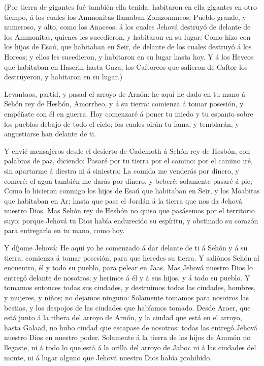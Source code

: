  (Por tierra de gigantes fué también ella tenida: habitaron
en ella gigantes en otro tiempo, á los cuales los Ammonitas llamaban
Zomzommeos;  Pueblo grande, y numeroso, y alto, como los
Anaceos; á los cuales Jehová destruyó de delante de los Ammonitas,
quienes les sucedieron, y habitaron en su lugar:  Como hizo
con los hijos de Esaú, que habitaban en Seir, de delante de los cuales
destruyó á los Horeos; y ellos les sucedieron, y habitaron en su lugar
hasta hoy.  Y á los Heveos que habitaban en Haserin hasta
Gaza, los Caftoreos que salieron de Caftor los destruyeron, y habitaron
en su lugar.)

 Levantaos, partid, y pasad el arroyo de Arnón: he aquí he
dado en tu mano á Sehón rey de Hesbón, Amorrheo, y á su tierra: comienza
á tomar posesión, y empéñate con él en guerra.  Hoy
comenzaré á poner tu miedo y tu espanto sobre los pueblos debajo de todo
el cielo; los cuales oirán tu fama, y temblarán, y angustiarse han
delante de ti.

 Y envié mensajeros desde el desierto de Cademoth á Sehón
rey de Hesbón, con palabras de paz, diciendo:  Pasaré por
tu tierra por el camino: por el camino iré, sin apartarme á diestra ni á
siniestra:  La comida me venderás por dinero, y comeré: el
agua también me darás por dinero, y beberé: solamente pasaré á pie;
 Como lo hicieron conmigo los hijos de Esaú que habitaban
en Seir, y los Moabitas que habitaban en Ar; hasta que pase el Jordán á
la tierra que nos da Jehová nuestro Dios.  Mas Sehón rey de
Hesbón no quiso que pasásemos por el territorio suyo; porque Jehová tu
Dios había endurecido su espíritu, y obstinado su corazón para
entregarlo en tu mano, como hoy.

 Y díjome Jehová: He aquí yo he comenzado á dar delante de
ti á Sehón y á su tierra; comienza á tomar posesión, para que heredes su
tierra.  Y saliónos Sehón al encuentro, él y todo su
pueblo, para pelear en Jaas.  Mas Jehová nuestro Dios lo
entregó delante de nosotros; y herimos á él y á sus hijos, y á todo su
pueblo.  Y tomamos entonces todas sus ciudades, y
destruimos todas las ciudades, hombres, y mujeres, y niños; no dejamos
ninguno:  Solamente tomamos para nosotros las bestias, y
los despojos de las ciudades que habíamos tomado.  Desde
Aroer, que está junto á la ribera del arroyo de Arnón, y la ciudad que
está en el arroyo, hasta Galaad, no hubo ciudad que escapase de
nosotros: todas las entregó Jehová nuestro Dios en nuestro poder.
 Solamente á la tierra de los hijos de Ammón no llegaste,
ni á todo lo que está á la orilla del arroyo de Jaboc ni á las ciudades
del monte, ni á lugar alguno que Jehová nuestro Dios había prohibido.

